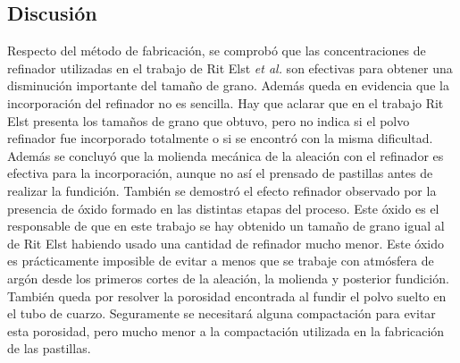 \documentclass[a4paper,12pt,fleqn,twoside,openany]{book}
\begin{document}
% 
% 
% 
% 
% 

\subsection{Discusión} \label{TamañosConclusion}

Respecto del método de fabricación, se comprobó que las concentraciones de refinador utilizadas en el trabajo de Rit Elst \textit{et al.} \cite{ritelst} son efectivas para obtener una disminución importante del tamaño de grano. Además queda en evidencia que la incorporación del refinador no es sencilla. Hay que aclarar que en el trabajo Rit Elst presenta los tamaños de grano que obtuvo, pero no indica si el polvo refinador fue incorporado totalmente o si se encontró con la misma dificultad. Además se concluyó que la molienda mecánica de la aleación con el refinador es efectiva para la incorporación, aunque no así el prensado de pastillas antes de realizar la fundición. También se demostró el efecto refinador observado por la presencia de óxido formado en las distintas etapas del proceso. Este óxido es el responsable de que en este trabajo se hay obtenido un tamaño de grano igual al de Rit Elst habiendo usado una cantidad de refinador mucho menor. Este óxido es prácticamente imposible de evitar a menos que se trabaje con atmósfera de argón desde los primeros cortes de la aleación, la molienda y posterior fundición. También queda por resolver la porosidad encontrada al fundir el polvo suelto en el tubo de cuarzo. Seguramente se necesitará alguna compactación para evitar esta porosidad, pero mucho menor a la compactación utilizada en la fabricación de las pastillas.
\end{document}
